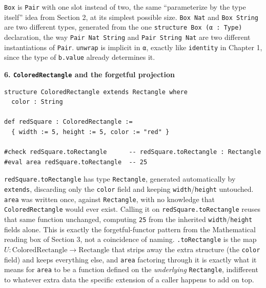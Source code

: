 \texttt{Box} is \texttt{Pair} with one slot instead of two, the same ``parameterize by the type itself'' idea from Section 2, at its simplest possible size. \texttt{Box Nat} and \texttt{Box String} are two different types, generated from the one \texttt{structure Box (α : Type)} declaration, the way \texttt{Pair Nat String} and \texttt{Pair String Nat} are two different instantiations of \texttt{Pair}. \texttt{unwrap} is implicit in \texttt{α}, exactly like \texttt{identity} in Chapter 1, since the type of \texttt{b.value} already determines it.

\textbf{6. \texttt{ColoredRectangle} and the forgetful projection}

\begin{lstlisting}
structure ColoredRectangle extends Rectangle where
  color : String

def redSquare : ColoredRectangle :=
  { width := 5, height := 5, color := "red" }

#check redSquare.toRectangle      -- redSquare.toRectangle : Rectangle
#eval area redSquare.toRectangle  -- 25
\end{lstlisting}

\texttt{redSquare.toRectangle} has type \texttt{Rectangle}, generated automatically by \texttt{extends}, discarding only the \texttt{color} field and keeping \texttt{width}/\texttt{height} untouched. \texttt{area} was written once, against \texttt{Rectangle}, with no knowledge that \texttt{ColoredRectangle} would ever exist. Calling it on \texttt{redSquare.toRectangle} reuses that same function unchanged, computing \texttt{25} from the inherited \texttt{width}/\texttt{height} fields alone. This is exactly the forgetful-functor pattern from the Mathematical reading box of Section 3, not a coincidence of naming. \texttt{.toRectangle} is the map \(U : \mathrm{ColoredRectangle} \to \mathrm{Rectangle}\) that strips away the extra structure (the \texttt{color} field) and keeps everything else, and \texttt{area} factoring through it is exactly what it means for \texttt{area} to be a function defined on the \emph{underlying} \texttt{Rectangle}, indifferent to whatever extra data the specific extension of a caller happens to add on top.
